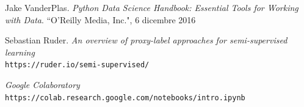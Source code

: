 \documentclass[12pt,italian]{report}
\begin{document}
\begin{thebibliography}{9}
 	Jake VanderPlas. 
 	\textit{Python Data Science Handbook: Essential Tools for Working with Data}. 
 	``O'Reilly Media, Inc.", 6 dicembre 2016

 	Sebastian Ruder. \textit{An overview of proxy-label approaches for semi-supervised learning}
 	\\\texttt{https://ruder.io/semi-supervised/}
 	
 	\textit{Google Colaboratory}
 	\\\texttt{https://colab.research.google.com/notebooks/intro.ipynb}
\end{thebibliography}
\end{document}
